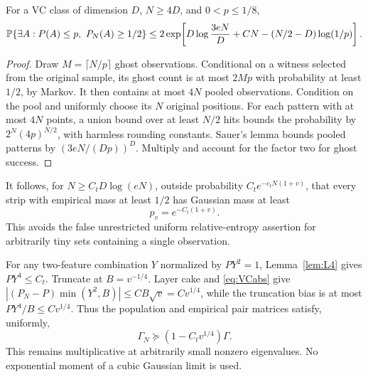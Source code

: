 \documentclass[11pt]{article}
\begin{document}
\begin{lemma}\label{lem:rare}
For a VC class of dimension $D$, $N\ge4D$, and $0<p\le1/8$,
\[
 \mathbb P\{\exists A:P(A)\le p,\ P_N(A)\ge1/2\}
 \le2\exp\!\left[D\log\frac{3eN}{D}+CN-(N/2-D)\log(1/p)\right].
\]
\end{lemma}
\begin{proof}
Draw $M=\lceil N/p\rceil$ ghost observations. Conditional on a witness selected from the original sample, its ghost count is at most $2Mp$ with probability at least $1/2$, by Markov. It then contains at most $4N$ pooled observations. Condition on the pool and uniformly choose its $N$ original positions. For each pattern with at most $4N$ points, a union bound over at least $N/2$ hits bounds the probability by $2^N(4p)^{N/2}$, with harmless rounding constants. Sauer's lemma bounds pooled patterns by $(3eN/(Dp))^D$. Multiply and account for the factor two for ghost success.
\end{proof}
It follows, for $N\ge C_tD\log(eN)$, outside probability $C_te^{-c_tN(1+v)}$, that every strip with empirical mass at least $1/2$ has Gaussian mass at least
\begin{equation}\label{eq:rarefloor}
 p_v=e^{-C_t(1+v)}.
\end{equation}
This avoids the false unrestricted uniform relative-entropy assertion for arbitrarily tiny sets containing a single observation.

For any two-feature combination $Y$ normalized by $PY^2=1$, Lemma~\ref{lem:L4} gives $PY^4\le C_t$. Truncate at $B=v^{-1/4}$. Layer cake and \eqref{eq:VCabs} give
$|(P_N-P)\min(Y^2,B)|\le CB\sqrt v=Cv^{1/4}$, while the truncation bias is at most $PY^4/B\le Cv^{1/4}$. Thus the population and empirical pair matrices satisfy, uniformly,
\begin{equation}\label{eq:pairPSD}
 \Gamma_N\succeq(1-C_tv^{1/4})\Gamma.
\end{equation}
This remains multiplicative at arbitrarily small nonzero eigenvalues. No exponential moment of a cubic Gaussian limit is used.
\end{document}
